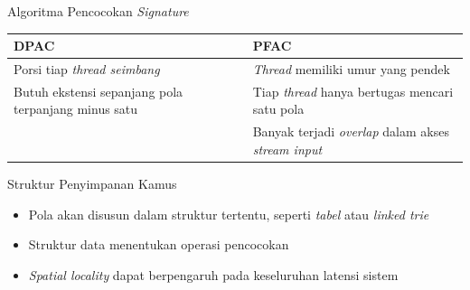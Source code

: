\documentclass[10pt]{beamer}
\begin{document}
\begin{frame}{Algoritma Pencocokan \emph{Signature}}
    \begin{table}
    \begin{tabular}{@{} p{5cm}p{5cm} @{}}
        \toprule
        DPAC & PFAC\\
        \midrule
        Porsi tiap \emph{thread seimbang} & \emph{Thread} memiliki umur yang pendek \\
        Butuh ekstensi sepanjang pola terpanjang minus satu & Tiap \emph{thread} hanya bertugas mencari satu pola\\
         & Banyak terjadi \emph{overlap} dalam akses \emph{stream input}\\
        \bottomrule
    \end{tabular}
    \end{table}
\end{frame}

\begin{frame}[fragile]{Struktur Penyimpanan Kamus}
    \begin{itemize}

        \item Pola akan disusun dalam struktur tertentu, seperti \emph{tabel} atau \emph{linked trie}
        
        \item Struktur data menentukan operasi pencocokan

        \item \emph{Spatial locality} dapat berpengaruh pada keseluruhan latensi sistem

    \end{itemize}
\end{frame}
\end{document}

